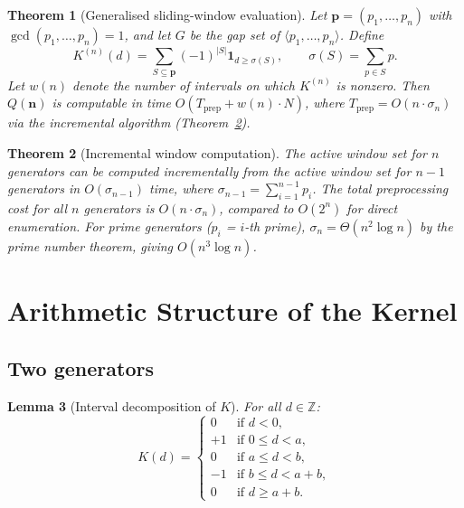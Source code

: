 \documentclass[11pt,a4paper]{amsart}
\theoremstyle{plain}
\newtheorem{theorem}{Theorem}[section]
\newtheorem{lemma}[theorem]{Lemma}
\theoremstyle{definition}
\theoremstyle{remark}
\begin{document}
\begin{theorem}[Generalised sliding-window evaluation]
\label{thm:general}
Let $\mathbf{p} = (p_1,\ldots,p_n)$ with $\gcd(p_1,\ldots,p_n)=1$,
and let $G$ be the gap set of $\langle p_1,\ldots,p_n\rangle$.
Define
\[
  K^{(n)}(d) = \sum_{S \subseteq \mathbf{p}} (-1)^{|S|} \mathbf{1}_{d \geq \sigma(S)},
  \qquad \sigma(S) = \sum_{p \in S} p.
\]
Let $w(n)$ denote the number of intervals on which $K^{(n)}$ is nonzero.
Then $Q(\mathbf{n})$ is computable in time $O(T_{\mathrm{prep}} + w(n) \cdot N)$,
where $T_{\mathrm{prep}} = O(n \cdot \sigma_n)$ via the incremental algorithm
(Theorem~\ref{thm:incremental}).
\end{theorem}

\begin{theorem}[Incremental window computation]
\label{thm:incremental}
The active window set for $n$ generators can be computed incrementally
from the active window set for $n-1$ generators in $O(\sigma_{n-1})$
time, where $\sigma_{n-1} = \sum_{i=1}^{n-1} p_i$.
The total preprocessing cost for all $n$ generators is $O(n \cdot \sigma_n)$,
compared to $O(2^n)$ for direct enumeration. For prime generators
($p_i$ = $i$-th prime), $\sigma_n = \Theta(n^2 \log n)$ by the prime number
theorem, giving $O(n^3 \log n)$.
\end{theorem}

\section{Arithmetic Structure of the Kernel}
\label{sec:kernel}

\subsection{Two generators}

\begin{lemma}[Interval decomposition of $K$]
\label{lem:K-intervals}
For all $d \in \mathbb{Z}$:
\[
  K(d) =
  \begin{cases}
    0  & \text{if } d < 0, \\
    +1 & \text{if } 0 \leq d < a, \\
    0  & \text{if } a \leq d < b, \\
    -1 & \text{if } b \leq d < a+b, \\
    0  & \text{if } d \geq a+b.
  \end{cases}
\]
\end{lemma}
\end{document}
